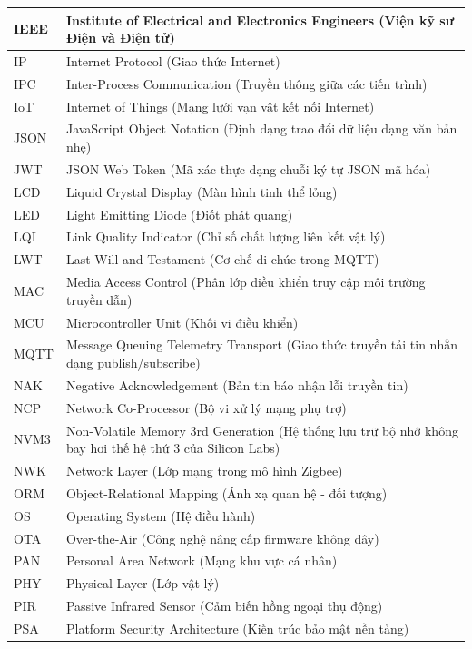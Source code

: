 \begin{longtable}{|l|p{12cm}|}
IEEE & Institute of Electrical and Electronics Engineers (Viện kỹ sư Điện và Điện tử) \\ \hline
IP & Internet Protocol (Giao thức Internet) \\ \hline
IPC & Inter-Process Communication (Truyền thông giữa các tiến trình) \\ \hline
IoT & Internet of Things (Mạng lưới vạn vật kết nối Internet) \\ \hline
JSON & JavaScript Object Notation (Định dạng trao đổi dữ liệu dạng văn bản nhẹ) \\ \hline
JWT & JSON Web Token (Mã xác thực dạng chuỗi ký tự JSON mã hóa) \\ \hline
LCD & Liquid Crystal Display (Màn hình tinh thể lỏng) \\ \hline
LED & Light Emitting Diode (Điốt phát quang) \\ \hline
LQI & Link Quality Indicator (Chỉ số chất lượng liên kết vật lý) \\ \hline
LWT & Last Will and Testament (Cơ chế di chúc trong MQTT) \\ \hline
MAC & Media Access Control (Phân lớp điều khiển truy cập môi trường truyền dẫn) \\ \hline
MCU & Microcontroller Unit (Khối vi điều khiển) \\ \hline
MQTT & Message Queuing Telemetry Transport (Giao thức truyền tải tin nhắn dạng publish/subscribe) \\ \hline
NAK & Negative Acknowledgement (Bản tin báo nhận lỗi truyền tin) \\ \hline
NCP & Network Co-Processor (Bộ vi xử lý mạng phụ trợ) \\ \hline
NVM3 & Non-Volatile Memory 3rd Generation (Hệ thống lưu trữ bộ nhớ không bay hơi thế hệ thứ 3 của Silicon Labs) \\ \hline
NWK & Network Layer (Lớp mạng trong mô hình Zigbee) \\ \hline
ORM & Object-Relational Mapping (Ánh xạ quan hệ - đối tượng) \\ \hline
OS & Operating System (Hệ điều hành) \\ \hline
OTA & Over-the-Air (Công nghệ nâng cấp firmware không dây) \\ \hline
PAN & Personal Area Network (Mạng khu vực cá nhân) \\ \hline
PHY & Physical Layer (Lớp vật lý) \\ \hline
PIR & Passive Infrared Sensor (Cảm biến hồng ngoại thụ động) \\ \hline
PSA & Platform Security Architecture (Kiến trúc bảo mật nền tảng) \\ \hline

\end{longtable}
